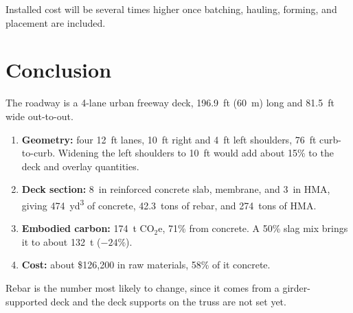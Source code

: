 \documentclass[11pt]{article}
\begin{document}
Installed cost will be several times higher once batching, hauling, forming, and placement are included.

\section{Conclusion}
The roadway is a 4-lane urban freeway deck, \SI{196.9}{ft} (\SI{60}{m}) long and \SI{81.5}{ft} wide out-to-out.
\begin{enumerate}
    \item \textbf{Geometry:} four \SI{12}{ft} lanes, \SI{10}{ft} right and \SI{4}{ft} left shoulders, \SI{76}{ft} curb-to-curb. Widening the left shoulders to \SI{10}{ft} would add about 15\% to the deck and overlay quantities.
    \item \textbf{Deck section:} \SI{8}{in} reinforced concrete slab, membrane, and \SI{3}{in} HMA, giving \SI{474}{yd^3} of concrete, \SI{42.3}{tons} of rebar, and \SI{274}{tons} of HMA.
    \item \textbf{Embodied carbon:} \SI{174}{t} CO$_2$e, 71\% from concrete. A 50\% slag mix brings it to about \SI{132}{t} ($-24\%$).
    \item \textbf{Cost:} about \$126{,}200 in raw materials, 58\% of it concrete.
\end{enumerate}
Rebar is the number most likely to change, since it comes from a girder-supported deck and the deck supports on the truss are not set yet.
\end{document}
